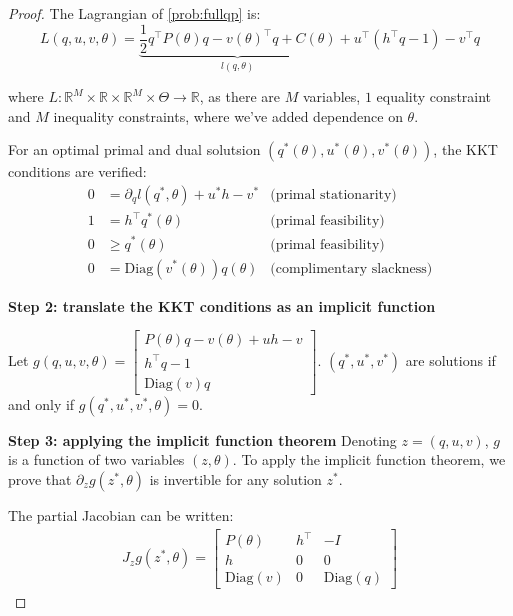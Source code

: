 \begin{proof}
The Lagrangian of \cref{prob:fullqp} is:
\begin{equation}
    L(q, u, v, \theta) = \underbrace{\frac{1}{2}q^\top P(\theta)q - v(\theta)^\top q + C(\theta)}_{l(q, \theta)}+ u^\top (h^\top q - 1) - v^\top q
\end{equation}

where $L: \mathbb R^M \times \mathbb R \times \mathbb R^M\times\Theta\to\mathbb R$, as there are $M$ variables, $1$ equality constraint and $M$ inequality constraints, where we've added dependence on $\theta$.

For an optimal primal and dual solutsion $(q^*(\theta), u^*(\theta), v^*(\theta))$, the KKT conditions are verified:
\begin{align}
    0 &= \partial_q l(q^*, \theta) + u^*h - v^* &\text{(primal stationarity)}\\
    1 & =h^\top q^*(\theta)  & \text{(primal feasibility)} \\
    0 & \geq q^*(\theta) & \text{(primal feasibility)}\\
    0 & = \mathrm{Diag}(v^*(\theta))q(\theta) & \text{(complimentary slackness)}
\end{align}






\textbf{Step 2: translate the KKT conditions as an implicit function}

Let $g(q, u, v, \theta) = \begin{bmatrix}
    P(\theta)q - v(\theta) + uh - v\\
    h^\top q- 1\\
    \mathrm{Diag}(v)q
\end{bmatrix}$. $(q^*, u^*, v^*)$ are solutions if and only if $g(q^*, u^*, v^*, \theta) = 0$.

\textbf{Step 3: applying the implicit function theorem}
Denoting $z = (q, u, v)$, $g$ is a function of two variables $(z, \theta)$. To apply the implicit function theorem, we prove that $\partial_z g(z^*, \theta)$ is invertible for any solution $z^*$.

The partial Jacobian can be written:
\begin{align}
    J_z g(z^*, \theta) = \begin{bmatrix}
    P(\theta) & h^\top  & - I\\
    h & 0 & 0\\
    \mathrm{Diag}(v)& 0 & \mathrm{Diag}(q)
    \end{bmatrix}
\end{align}


\end{proof}
